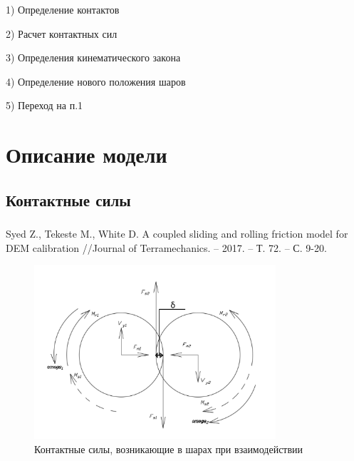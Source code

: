 \documentclass[c]{beamer}  %
\begin{document}
\begin{frame}
\frametitle{\insertsection} 
\framesubtitle{\insertsubsection}

1) Определение контактов

2) Расчет контактных сил

3) Определения кинематического закона

4) Определение нового положения шаров

5) Переход на п.1
\end{frame}


\section{Описание модели}

\subsection{Контактные силы}




\begin{frame}
\frametitle{\insertsection} 
\framesubtitle{\insertsubsection}
Syed Z., Tekeste M., White D. A coupled sliding and rolling friction model for DEM calibration //Journal of Terramechanics. – 2017. – Т. 72. – С. 9-20.
\begin{figure}[h!]
	\centering
	\includegraphics[width=0.8\textwidth]{sily}
	\caption{Контактные силы, возникающие в шарах при взаимодействии}
\end{figure} 
\end{frame}
\end{document}
